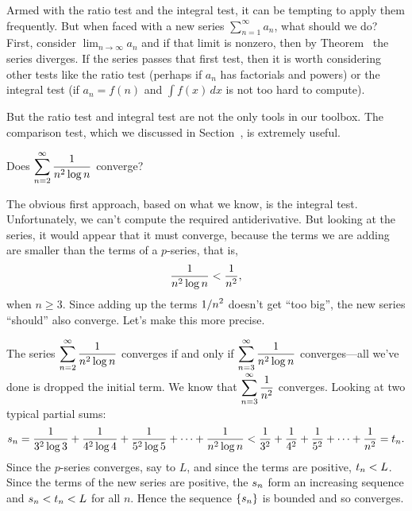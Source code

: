 

Armed with the ratio test and the integral test, it can be tempting to
apply them frequently.  But when faced with a new series
$\sum_{n=1}^\infty a_n$, what should we do?  First, consider $\lim_{n
  \to \infty} a_n$ and if that limit is nonzero, then by
Theorem~ the series diverges.  If the series
passes that first test, then it is worth considering other tests like
the ratio test (perhaps if $a_n$ has factorials and powers) or the
integral test (if $a_n = f(n)$ and $\int f(x) \, dx$ is not too hard
to compute).

But the ratio test and integral test are not the only tools in our
toolbox.  The comparison test, which we discussed in
Section~, is extremely useful.

\begin{example}
  \label{example:reciprocal-n-squared-log-n}
  Does $\displaystyle\sum_{n=2}^\infty {1\over n^2\log n}$ converge?
\end{example}


\begin{solution}
The obvious first approach, based on what we know, is the integral test.
Unfortunately, we can't compute the required antiderivative. But
looking at the series, it would appear that it must converge, because
the terms we are adding are smaller than the terms of a $p$-series,
that is,
$${1\over n^2\log n}<{1\over n^2},$$
when $n\ge3$. Since adding up the terms $\displaystyle 1/n^2$ doesn't get ``too
big'', the new series ``should'' also converge. Let's make this more
precise.

The series $\displaystyle\sum_{n=2}^\infty {1\over n^2\log n}$ converges if and
only if $\displaystyle\sum_{n=3}^\infty {1\over n^2\log n}$ converges---all we've
done is dropped the initial term. We know that 
$\displaystyle\sum_{n=3}^\infty {1\over n^2}$ converges. Looking at two typical
partial sums:
$$
  s_n={1\over 3^2\log 3}+{1\over 4^2\log 4}+{1\over 5^2\log 5}+\cdots+
  {1\over n^2\log n} < {1\over 3^2}+{1\over 4^2}+
  {1\over 5^2}+\cdots+{1\over n^2}=t_n.
$$
Since the $p$-series converges, say to $L$, and since the terms are positive,
$\displaystyle t_n<L$. Since the terms of the new series are positive, the $\displaystyle s_n$
form an increasing sequence and $\displaystyle s_n<t_n<L$ for all $n$. Hence the
sequence $\displaystyle \{s_n\}$ is bounded and so converges.
\end{solution}

